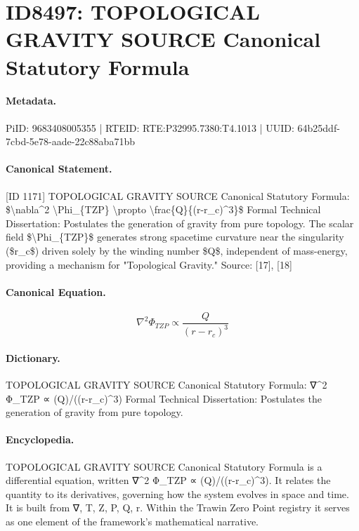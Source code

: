 \section*{ID8497: TOPOLOGICAL GRAVITY SOURCE Canonical Statutory Formula}
\paragraph{Metadata.}
PiID: 9683408005355 | RTEID: RTE:P32995.7380:T4.1013 | UUID: 64b25ddf-7cbd-5e78-aade-22c88aba71bb

\paragraph{Canonical Statement.}
[ID 1171] TOPOLOGICAL GRAVITY SOURCE Canonical Statutory Formula: \$\textbackslash{}nabla\textasciicircum{}2 \textbackslash{}Phi\_\{TZP\} \textbackslash{}propto \textbackslash{}frac\{Q\}\{(r-r\_c)\textasciicircum{}3\}\$ Formal Technical Dissertation: Postulates the generation of gravity from pure topology. The scalar field \$\textbackslash{}Phi\_\{TZP\}\$ generates strong spacetime curvature near the singularity (\$r\_c\$) driven solely by the winding number \$Q\$, independent of mass-energy, providing a mechanism for "Topological Gravity." Source: [17], [18]

\paragraph{Canonical Equation.}
\[
\nabla^2 \Phi_{TZP} \propto \frac{Q}{(r-r_c)^3}
\]

\paragraph{Dictionary.}
TOPOLOGICAL GRAVITY SOURCE Canonical Statutory Formula: ∇\textasciicircum{}2 Φ\_TZP ∝ (Q)/((r-r\_c)\textasciicircum{}3) Formal Technical Dissertation: Postulates the generation of gravity from pure topology.

\paragraph{Encyclopedia.}
TOPOLOGICAL GRAVITY SOURCE Canonical Statutory Formula is a differential equation, written ∇\textasciicircum{}2 Φ\_TZP ∝ (Q)/((r-r\_c)\textasciicircum{}3). It relates the quantity to its derivatives, governing how the system evolves in space and time. It is built from ∇, T, Z, P, Q, r. Within the Trawin Zero Point registry it serves as one element of the framework's mathematical narrative.
